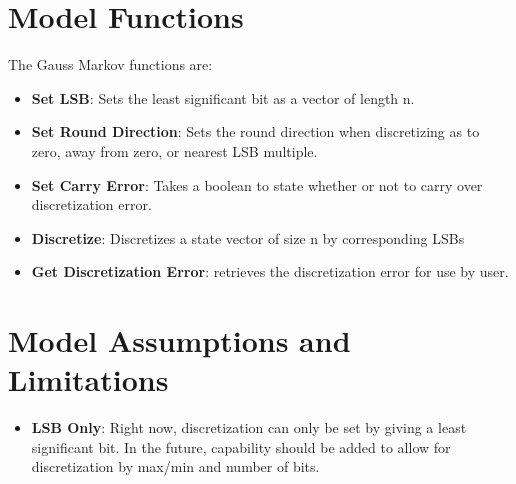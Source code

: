 \section{Model Functions}
The Gauss Markov functions are:
\begin{itemize}
	\item \textbf{Set LSB}: Sets the least significant bit as a vector of length n.
	\item \textbf{Set Round Direction}: Sets the round direction when discretizing as to zero, away from zero, or nearest LSB multiple.
	\item \textbf{Set Carry Error}: Takes a boolean to state whether or not to carry over discretization error.
	\item \textbf{Discretize}: Discretizes a state vector of size n by corresponding LSBs
	\item \textbf{Get Discretization Error}: retrieves the discretization error for use by user.
\end{itemize}


\section{Model Assumptions and Limitations}
\begin{itemize}
	\item \textbf{LSB Only}: Right now, discretization can only be set by giving a least significant bit. In the future, capability should be added to allow for discretization by max/min and number of bits.
\end{itemize}